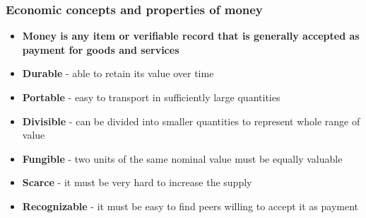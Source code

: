 \documentclass{beamer}
\begin{document}

\begin{frame}
  \frametitle{Economic concepts and properties of money}
  \begin{itemize}
  \item \textbf{Money is any item or verifiable record that is generally accepted as
    payment for goods and services}
  \item \textbf{Durable} - able to retain its value over time
  \item \textbf{Portable} - easy to transport in sufficiently large quantities
  \item \textbf{Divisible} - can be divided into smaller quantities to represent whole
    range of value
  \item \textbf{Fungible} - two units of the same nominal value must be equally valuable
  \item \textbf{Scarce} - it must be very hard to increase the supply
  \item \textbf{Recognizable} - it must be easy to find peers willing to accept
    it as payment
  \end{itemize}
\end{frame}
\end{document}
